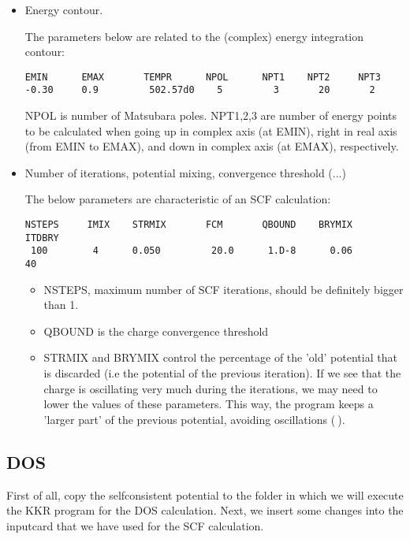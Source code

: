 \documentclass[a4paper,10pt,fullpage]{report}
\begin{document}
\begin{itemize}

\item Energy contour.

The parameters below are related to the (complex) energy integration contour:
\begin{verbatim}
EMIN      EMAX       TEMPR      NPOL      NPT1    NPT2     NPT3
-0.30     0.9         502.57d0    5         3       20       2
\end{verbatim}
NPOL is number of Matsubara poles. NPT1,2,3 are number of energy points 
to be calculated when going up in complex axis (at EMIN), 
right in real axis (from EMIN to EMAX), and down in complex axis (at EMAX), respectively.



\item Number of iterations, potential mixing, convergence threshold (...)

The below parameters are characteristic of an SCF calculation:
\begin{verbatim}
NSTEPS     IMIX    STRMIX       FCM       QBOUND    BRYMIX      ITDBRY
 100        4      0.050         20.0      1.D-8      0.06        40
\end{verbatim}

\begin{itemize}
\item NSTEPS, maximum number of SCF iterations, should be definitely bigger than 1.
\item QBOUND is the charge convergence threshold
\item STRMIX and BRYMIX control the percentage of the 'old' potential that is discarded
(i.e the potential of the previous iteration).
If we see that the charge is oscillating very much during the iterations, we may need to lower
the values of these parameters. This way, the program keeps a 'larger part' of the previous potential,
avoiding oscillations ($~$).
\end{itemize}




\end{itemize}

\subsection{DOS}

First of all, copy the selfconsistent potential to the folder in which we 
will execute the KKR program for the DOS calculation. 
Next, we insert some changes into the inputcard that we have used
for the SCF calculation. 
\end{document}
